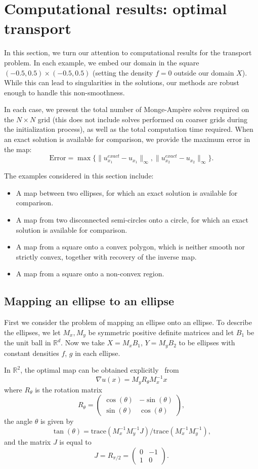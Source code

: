 \documentclass{amsart}
\theoremstyle{lemma}
\theoremstyle{remark}
\begin{document}
\section{Computational results: optimal transport}\label{sec:resultsTransport}
In this section, we turn our attention to computational results for the transport problem. In each example, we embed our domain in the square $(-0.5,0.5)\times(-0.5,0.5)$ (setting the density $f=0$ outside our domain $X$).  While this can lead to singularities in the solutions, our methods are robust enough to handle this non-smoothness.

In each case, we present the total number of {{Monge-Amp\`ere}\xspace} solves required on the $N\times N$ grid (this does not include solves performed on coarser grids during the initialization process), as well as the total computation time required.  When an exact solution is available for comparison, we provide the maximum error in the map:
\[ \text{Error} = \max\{\|u^{exact}_{x_1}-u_{x_1}\|_\infty,\|u^{exact}_{x_2}-u_{x_2}\|_\infty\}. \]

The examples considered in this section include:
\begin{itemize}
\item A map between two ellipses, for which an exact solution is available for comparison.
\item A map from two disconnected semi-circles onto a circle, for which an exact solution is available for comparison.
\item A map from a square onto a convex polygon, which is neither smooth nor strictly convex, together with recovery of the inverse map.
\item A map from a square onto a non-convex region.
\end{itemize}

\subsection{Mapping an ellipse to an ellipse}\label{sec:exEllipse}
First we consider the problem of mapping an ellipse onto an ellipse.  
To describe the ellipses, we let $M_x,M_y$ be symmetric positive definite matrices and let $B_1$ be the unit ball in ${\mathbb{R}}^d$.
Now we take $X = M_xB_1$, $Y = M_yB_2$ to be ellipses with constant densities $f$, $g$ in each ellipse.

In ${\mathbb{R}}^2$, the optimal map can be obtained explicitly~\cite{MOEllipse} from
\[ \nabla u(x) = M_yR_\theta M_x^{-1}x\]
where $R_\theta$ is the rotation matrix
\[ R_\theta = \left(\begin{array}{cc} \cos(\theta) & -\sin(\theta)\\ \sin(\theta) & \cos(\theta)\end{array}\right), \]
the angle $\theta$ is given by
\[ \tan(\theta) = {\text{trace}}(M_x^{-1}M_y^{-1}J)/{\text{trace}}(M_x^{-1}M_y^{-1}), \]
and the matrix $J$ is equal to
\[ J = R_{\pi/2} = \left(\begin{array}{cc} 0 & -1\\ 1 & 0\end{array}\right). \]
\end{document}
